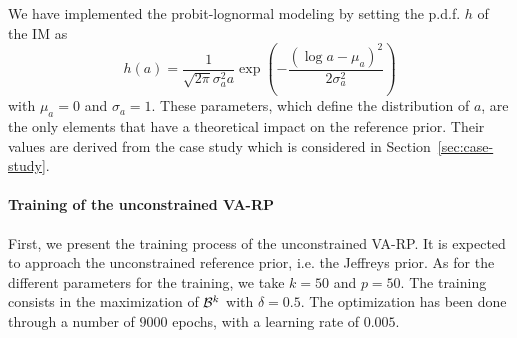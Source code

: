 We have implemented the probit-lognormal modeling by setting the p.d.f. $h$ of the IM as
    \begin{equation}
        h(a) = \frac{1}{\sqrt{2\pi}\sigma_a^2 a}\exp\left(-\frac{(\log a-\mu_a)^2}{2\sigma_a^2}\right)
    \end{equation}
with
$\mu_a=0$ and $\sigma_a=1$. These parameters, which define the distribution of $a$, are the only elements that have a theoretical impact on the reference prior. Their values are derived from the case study which is considered in Section~\ref{sec:case-study}.





\paragraph{Training of the unconstrained VA-RP}
First, we present the training process of the unconstrained VA-RP. It is expected to approach the unconstrained reference prior, i.e. the Jeffreys prior. 
As for the different parameters 
for the training, we take $k=50$ and $p=50$. The training consists in the maximization of $\mathcal{B}^k$ with $\delta=0.5$. 
The optimization has been done through a number of $9000$ epochs, with a learning rate of $0.005$.


